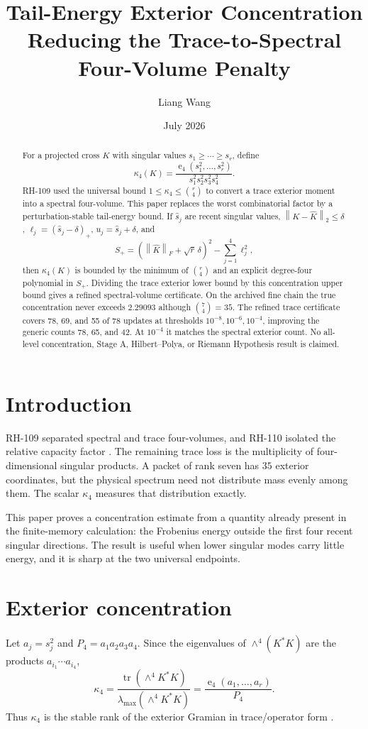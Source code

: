 \documentclass[11pt]{article}
\title{Tail-Energy Exterior Concentration\\\large Reducing the Trace-to-Spectral Four-Volume Penalty}
\author{Liang Wang}\date{July 2026}
\newcommand{\norm}[1]{\left\lVert#1\right\rVert}\newcommand{\e}{\operatorname{e}}
\begin{document}
\maketitle
\begin{abstract}
For a projected cross $K$ with singular values $s_1\ge\cdots\ge s_r$, define
\[
 \kappa_4(K)=\frac{\e_4(s_1^2,\ldots,s_r^2)}{s_1^2s_2^2s_3^2s_4^2}.
\]
RH-109 used the universal bound $1\le\kappa_4\le\binom r4$ to convert a
trace exterior moment into a spectral four-volume.  This paper replaces the
worst combinatorial factor by a perturbation-stable tail-energy bound.  If
$\widehat s_j$ are recent singular values, $\norm{K-\widehat K}_2\le\delta$,
$\ell_j=(\widehat s_j-\delta)_+$, $u_j=\widehat s_j+\delta$, and
\[
 S_+=\left(\norm{\widehat K}_F+\sqrt r\,\delta\right)^2-
 \sum_{j=1}^4\ell_j^2,
\]
then $\kappa_4(K)$ is bounded by the minimum of $\binom r4$ and an explicit
degree-four polynomial in $S_+$.  Dividing the trace exterior lower bound by
this concentration upper bound gives a refined spectral-volume certificate.
On the archived fine chain the true concentration never exceeds $2.29093$
although $\binom74=35$.  The refined trace certificate covers 78, 69, and 55
of 78 updates at thresholds $10^{-8},10^{-6},10^{-4}$, improving the generic
counts 78, 65, and 42.  At $10^{-4}$ it matches the spectral exterior count.
No all-level concentration, Stage A, Hilbert--Polya, or Riemann Hypothesis
result is claimed.
\end{abstract}

\section{Introduction}
RH-109 separated spectral and trace four-volumes, and RH-110 isolated the
relative capacity factor \citep{WangExterior2026,WangCapacity2026}.  The
remaining trace loss is the multiplicity of four-dimensional singular
products.  A packet of rank seven has $35$ exterior coordinates, but the
physical spectrum need not distribute mass evenly among them.  The scalar
$\kappa_4$ measures that distribution exactly.

This paper proves a concentration estimate from a quantity already present
in the finite-memory calculation: the Frobenius energy outside the first four
recent singular directions.  The result is useful when lower singular modes
carry little energy, and it is sharp at the two universal endpoints.

\section{Exterior concentration}
Let $a_j=s_j^2$ and $P_4=a_1a_2a_3a_4$.  Since the eigenvalues of
$\wedge^4(K^*K)$ are the products $a_{i_1}\cdots a_{i_4}$,
\begin{equation}
 \kappa_4=\frac{\operatorname{tr}(\wedge^4K^*K)}
 {\lambda_{\max}(\wedge^4K^*K)}
 =\frac{\e_4(a_1,\ldots,a_r)}{P_4}.
 \label{eq:kappa}
\end{equation}
Thus $\kappa_4$ is the stable rank of the exterior Gramian in trace/operator
form \citep{HornJohnson1991}.
\end{document}
